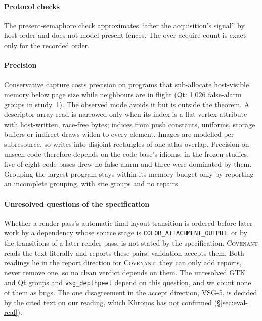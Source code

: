 \documentclass[acmtog,anonymous,review]{acmart}
\newcommand{\sys}{\textsc{Covenant}\xspace}
\newcommand{\code}[1]{\texttt{#1}}
\begin{document}
\paragraph{Protocol checks}
The present-semaphore check approximates ``after the acquisition's signal'' by host order and does not model present
fences. The over-acquire count is exact only for the recorded order.

\paragraph{Precision}
Conservative capture costs precision on programs that sub-allocate host-visible memory below page size while
neighbours are in flight (Qt: 1,026 false-alarm groups in study~1). The observed mode avoids it but is outside the
theorem. A descriptor-array read is narrowed only when its index is a flat vertex attribute with host-written,
race-free bytes; indices from push constants, uniforms, storage buffers or indirect draws widen to every element.
Images are modelled per subresource, so writes into disjoint rectangles of one atlas overlap. Precision on unseen
code therefore depends on the code base's idioms: in the frozen studies, five of eight code bases drew no false alarm
and three were dominated by them. Grouping the largest program stays within its memory budget only by reporting an
incomplete grouping, with site groups and no repairs.

\paragraph{Unresolved questions of the specification}
Whether a render pass's automatic final layout transition is ordered before later work by a dependency whose source
stage is \code{COLOR\_ATTACHMENT\_OUTPUT}, or by the transitions of a later render pass, is not stated by the
specification. \sys reads the text literally and reports these pairs; validation accepts them. Both readings lie in
the report direction for \sys: they can only add reports, never remove one, so no clean verdict depends on them. The
unresolved GTK and Qt groups and \code{vsg\_depthpeel} depend on this question, and we count none of them as bugs.
The one disagreement in the accept direction, VSG-5, is decided by the cited text on our reading, which Khronos has
not confirmed (\S\ref{sec:eval-real}).
\end{document}
